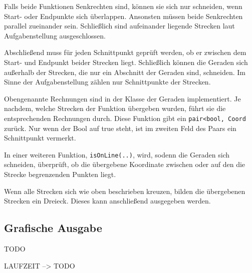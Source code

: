 Falls beide Funktionen Senkrechten sind, können sie sich nur schneiden, wenn Start- oder Endpunkte sich überlappen.
Ansonsten müssen beide Senkrechten parallel zueinander sein.
Schließlich sind aufeinander liegende Strecken laut Aufgabenstellung ausgeschlossen.

Abschließend muss für jeden Schnittpunkt geprüft werden, ob er zwischen dem Start- und Endpunkt beider Strecken liegt.
Schließlich können die Geraden sich außerhalb der Strecken, die nur ein Abschnitt der Geraden sind, schneiden.
Im Sinne der Aufgabenstellung zählen nur Schnittpunkte der Strecken.

Obengenannte Rechnungen sind in der Klasse der Geraden implementiert. Je nachdem, welche Strecken der Funktion übergeben wurden, führt sie die entsprechenden Rechnungen durch. Diese Funktion gibt ein \texttt{pair<bool, Coord} zurück.
Nur wenn der Bool auf true steht, ist im zweiten Feld des Paars ein Schnittpunkt vermerkt.

In einer weiteren Funktion, \texttt{isOnLine(..)}, wird, sodenn die Geraden sich schneiden, überprüft, ob die übergebene Koordinate zwischen oder auf den die Strecke begrenzenden Punkten liegt.

Wenn alle Strecken sich wie oben beschrieben kreuzen, bilden die übergebenen Strecken ein Dreieck. Dieses kann anschließend ausgegeben werden.

\subsection {Grafische Ausgabe}
TODO

LAUFZEIT --> TODO
